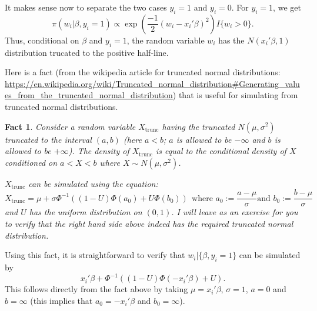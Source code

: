 \documentclass{scrartcl}
\newtheorem{fact}[theorem]{Fact}
\begin{document}
It makes sense now to separate the two cases $y_i = 1$ and $y_i =
0$. For $y_i = 1$, we get 
     \begin{equation*}
       \pi(w_i | \beta, y_i = 1) \propto \exp \left(\frac{-1}{2} (w_i - x_i' \beta)^2
                                               \right) I\{w_i > 0\}.
                                             \end{equation*}
Thus, conditional on $\beta$ and $y_i = 1$, the random variable $w_i$
has the $N(x_i' \beta, 1)$ distribution trucated to the positive
half-line. 

Here is a fact (from the wikipedia article for truncated normal
distributions:
\url{https://en.wikipedia.org/wiki/Truncated_normal_distribution#Generating_values_from_the_truncated_normal_distribution})
that is useful for simulating from truncated normal 
distributions.
\begin{fact}
  Consider a random variable $X_{\text{trunc}}$  having the truncated
  $N(\mu, \sigma^2)$ truncated to the interval $(a, b)$ (here $a < b$;
  $a$ is allowed to be $-\infty$ and $b$ is allowed to be
  $+\infty$). The density of $X_{\text{trunc}}$ is equal to the
  conditional density of $X$ conditioned on $a < X < b$ where $X \sim
  N(\mu, \sigma^2)$.

  $X_{\text{trunc}}$ can be simulated using the equation:
  \begin{equation*}
    X_{\text{trunc}} = \mu + \sigma \Phi^{-1} \left((1 - U)\Phi(a_0) + U
      \Phi(b_0) \right) ~~\text{where $a_0 := \frac{a - \mu}{\sigma}$
    and $b_0 := \frac{b - \mu}{\sigma}$}
\end{equation*}
and $U$ has the uniform distribution on $(0, 1)$. I will leave as an
exercise for you to verify that the right hand side above indeed has
the required truncated normal distribution. 
\end{fact}
Using this fact, it is straightforward to verify that $w_i|\{\beta,
y_i = 1\}$ can be simulated by
\begin{equation*}
x_i' \beta  + \Phi^{-1}  \left((1 - U) \Phi(-x_i' \beta) + U \right). 
\end{equation*}
This follows directly from the fact above by taking $\mu = x_i'
\beta$, $\sigma = 1$, $a = 0$ and $b = \infty$ (this implies that $a_0
= -x_i' \beta$ and $b_0 = \infty$).
\end{document}
